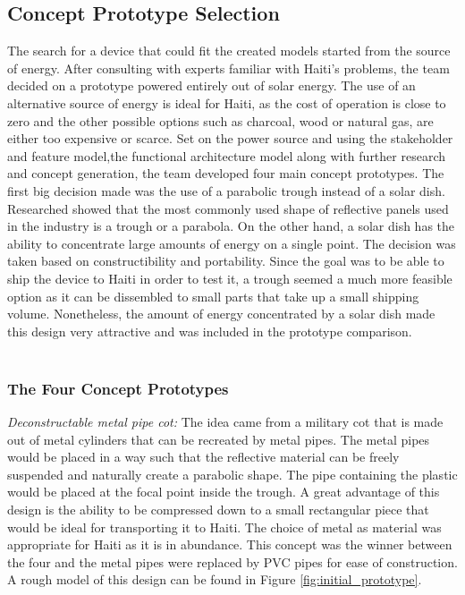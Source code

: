 \documentclass[11pt,english]{article}
\begin{document}
\subsection{Concept Prototype Selection}
The search for a device that could fit the created models started from the source of energy. After consulting with experts familiar with Haiti's problems, the team decided on a prototype powered entirely out of solar energy. The use of an alternative source of energy is ideal for Haiti, as the cost of operation is close to zero and the other possible options such as charcoal, wood or natural gas, are either too expensive or scarce. Set on the power source and using the stakeholder and feature model,the functional architecture model along with further research and concept generation, the team developed four main concept prototypes. The first big decision made was the use of a parabolic trough instead of a solar dish. Researched showed that the most commonly used shape of reflective panels used in the industry is a trough or a parabola. On the other hand, a solar dish has the ability to concentrate large amounts of energy on a single point. The decision was taken based on constructibility and portability. Since the goal was to be able to ship the device to Haiti in order to test it, a trough seemed a much more feasible option as it can be dissembled to small parts that take up a small shipping volume. Nonetheless, the amount of energy concentrated by a solar dish made this design very attractive and was included in the prototype comparison.\\
\\
\subsubsection{The Four Concept Prototypes}

\textit{Deconstructable metal pipe cot:} The idea came from a military cot that is made out of metal cylinders that can be recreated by metal pipes. The metal pipes would be placed in a way such that the reflective material can be freely suspended and naturally create a parabolic shape. The pipe containing the plastic would be placed at the focal point inside the trough. A great advantage of this design is the ability to be compressed down to a small rectangular piece that would be ideal for transporting it to Haiti. The choice of metal as material was appropriate for Haiti as it is in abundance. This concept was the winner between the four and the metal pipes were replaced by PVC pipes for ease of construction. A rough model of this design can be found in Figure \ref{fig:initial_prototype}. \\
\\
\end{document}

